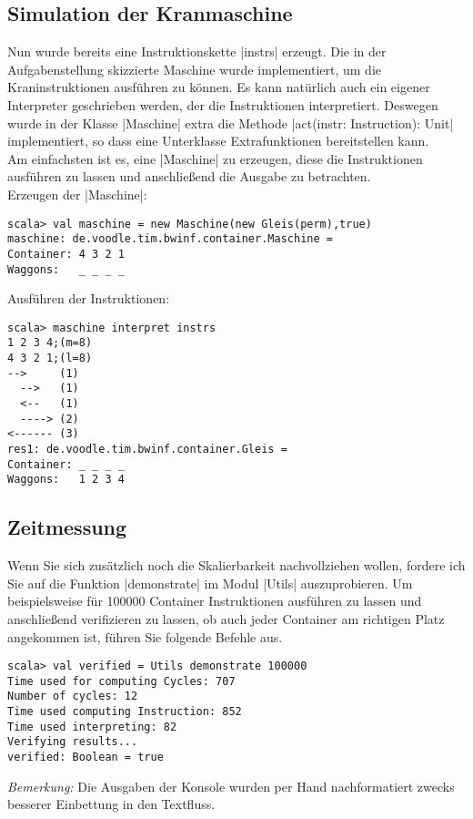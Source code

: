 \subsection{Simulation der Kranmaschine}
 Nun wurde bereits eine Instruktionskette |instrs| erzeugt.
 Die in der Aufgabenstellung skizzierte Maschine wurde implementiert, um die Kraninstruktionen ausführen zu können.
 Es kann natürlich auch ein eigener Interpreter geschrieben werden, der die Instruktionen interpretiert.
 Deswegen wurde in der Klasse |Maschine| extra die Methode |act(instr: Instruction): Unit| implementiert, so dass eine Unterklasse Extrafunktionen bereitstellen kann. \\
 Am einfachsten ist es, eine |Maschine| zu erzeugen, diese die Instruktionen ausführen zu lassen und anschließend die Ausgabe zu betrachten. \\
 Erzeugen der |Maschine|:
\begin{lstlisting}
scala> val maschine = new Maschine(new Gleis(perm),true)
maschine: de.voodle.tim.bwinf.container.Maschine = 
Container: 4 3 2 1
Waggons:   _ _ _ _
\end{lstlisting}
Ausführen der Instruktionen:
\begin{lstlisting}
scala> maschine interpret instrs
1 2 3 4;(m=8)
4 3 2 1;(l=8)
-->     (1)
  -->   (1)
  <--   (1)
  ----> (2)
<------ (3)
res1: de.voodle.tim.bwinf.container.Gleis = 
Container: _ _ _ _
Waggons:   1 2 3 4
\end{lstlisting}
\subsection{Zeitmessung}
Wenn Sie sich zusätzlich noch die Skalierbarkeit nachvollziehen wollen,
fordere ich Sie auf die Funktion |demonstrate| im Modul |Utils| auszuprobieren.
Um beispielsweise für 100000 Container Instruktionen ausführen zu lassen und anschließend verifizieren zu lassen,
ob auch jeder Container am richtigen Platz angekommen ist, führen Sie folgende Befehle aus.
\begin{lstlisting}
scala> val verified = Utils demonstrate 100000 
Time used for computing Cycles: 707
Number of cycles: 12
Time used computing Instruction: 852
Time used interpreting: 82
Verifying results...
verified: Boolean = true
\end{lstlisting}

\begin{flushright}
\begin{footnotesize}
\emph{Bemerkung:} Die Ausgaben der Konsole wurden per Hand nachformatiert zwecks besserer Einbettung in den Textfluss.
\end{footnotesize}
\end{flushright}

